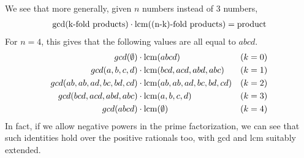We see that more generally, given $n$ numbers instead of 3 numbers,
\begin{align*}
  \gcd(\text{k-fold products})\cdot \operatorname*{lcm}(\text{(n-k)-fold products}) = \text{product}
\end{align*}
For $n=4$, this gives that the following values are all equal to $abcd$.
\begin{align*}
  gcd(\emptyset)&\cdot\operatorname*{lcm}(abcd) &(k=0)\\
  gcd(a,b,c,d)&\cdot\operatorname*{lcm}(bcd,acd,abd,abc) &(k=1)\\
  gcd(ab,ab,ad,bc,bd,cd)&\cdot\operatorname*{lcm}(ab,ab,ad,bc,bd,cd) &(k=2)\\
  gcd(bcd,acd,abd,abc)&\cdot\operatorname*{lcm}(a,b,c,d) &(k=3)\\
  gcd(abcd)&\cdot\operatorname*{lcm}(\emptyset) &(k=4)
\end{align*}
In fact, if we allow negative powers in the prime factorization,
we can see that such identities hold over the positive rationals too,
with gcd and lcm suitably extended.

